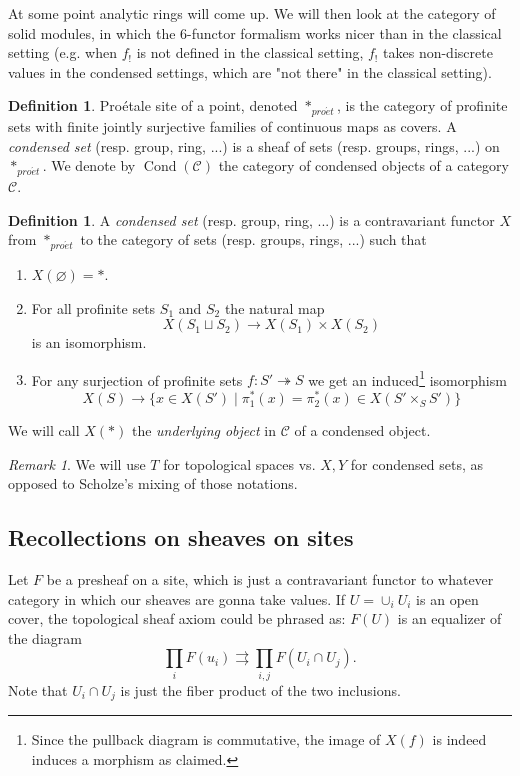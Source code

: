 \documentclass[11pt,A4]{article}
\theoremstyle{plain}
\theoremstyle{definition}
\newtheorem{defn}[thm]{Definition}
\theoremstyle{remark}
\newtheorem{rem}[thm]{Remark}
\newcommand{\1}{\mathbbm{1}}
\newcommand{\scrC}{\mathscr{C}}
\DeclareMathOperator{\Cond}{Cond}
\newcommand{\pe}{*_{pro\acute et}}
\newcommand{\fp}[1]{\times_{#1}}
\begin{document}
At some point analytic rings will come up.
We will then look at the category of solid modules, in which the 6-functor formalism works nicer than in the classical setting (e.g. when $f_{!}$ is not defined in the classical setting, $f_{!}$ takes non-discrete values in the condensed settings, which are "not there" in the classical setting).

\begin{defn}
    Pro\'{e}tale site of a point, denoted $\pe$, is the category of profinite sets with finite jointly surjective families of continuous maps as covers.
    A \textit{condensed set} (resp. group, ring, ...) is a sheaf of sets (resp. groups, rings, ...) on $\pe$.
    We denote by $\Cond(\scrC)$ the category of condensed objects of a category $\scrC$.
\end{defn}

\begin{defn}
    A \textit{condensed set} (resp. group, ring, ...) is a contravariant functor $X$ from $\pe$ to the category of sets (resp. groups, rings, ...) such that 
    \begin{enumerate}[label=\roman*)]
	\item $X(\varnothing)=*$.
	\item For all profinite sets $S_{1}$ and $S_{2}$ the natural map
	    \[ X(S_{1}\sqcup S_{2})\to X(S_{1})\times X(S_{2}) \]
	    is an isomorphism.
	\item For any surjection of profinite sets $f\colon S'\twoheadrightarrow S$ we get an induced\footnote{Since the pullback diagram is commutative, the image of $X(f)$ is indeed induces a morphism as claimed.} isomorphism
	    \[ X(S)\to \{ x\in X(S')\mid \pi_{1}^{*}(x)=\pi_{2}^{*}(x)\in X(S'\fp{S}S')\} \]
    \end{enumerate}
\end{defn}

We will call $X(*)$ the \textit{underlying object} in $\scrC$ of a condensed object.

\begin{rem}
    We will use $T$ for topological spaces vs. $X,Y$ for condensed sets, as opposed to Scholze's mixing of those notations.
\end{rem}

\subsection{Recollections on sheaves on sites}

Let $F$ be a presheaf on a site, which is just a contravariant functor to whatever category in which our sheaves are gonna take values.
If $U=\cup_{i}U_{i}$ is an open cover, the topological sheaf axiom could be phrased as: $F(U)$ is an equalizer of the diagram
\[ \prod_{i}F(u_{i})\rightrightarrows \prod_{i,j}F(U_{i}\cap U_{j}). \]
Note that $U_{i}\cap U_{j}$ is just the fiber product of the two inclusions.
\end{document}
